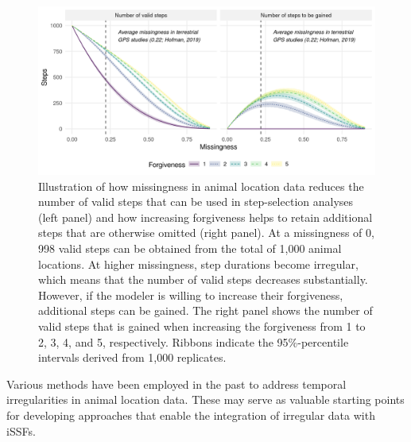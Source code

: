 \documentclass[abstract=on,10pt,a4paper,bibliography=totocnumbered]{article}
\begin{document}
\begin{figure}
  \begin{center}
  \includegraphics[width = \textwidth]{99_NumberOfSteps.png}
  \caption{Illustration of how missingness in animal location data reduces the
  number of valid steps that can be used in step-selection analyses (left panel)
  and how increasing forgiveness helps to retain additional steps that are
  otherwise omitted (right panel). At a missingness of 0, 998 valid steps can be
  obtained from the total of 1,000 animal locations. At higher missingness,
  step durations become irregular, which means that the number of valid steps
  decreases substantially. However, if the modeler is willing to increase their
  forgiveness, additional steps can be gained. The right panel shows the number
  of valid steps that is gained when increasing the forgiveness from 1 to
  2, 3, 4, and 5, respectively. Ribbons indicate the 95\%-percentile intervals
  derived from 1,000 replicates.}
  \label{NumberOfSteps}
  \end{center}
\end{figure}

Various methods have been employed in the past to address temporal
irregularities in animal location data. These may serve as valuable starting
points for developing approaches that enable the integration of irregular data
with iSSFs.
\end{document}
